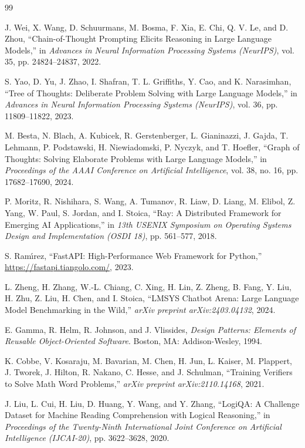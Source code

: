 \documentclass[12pt,a4paper]{report}
\begin{document}
\begin{thebibliography}{99}

 J. Wei, X. Wang, D. Schuurmans, M. Bosma, F. Xia, E. Chi, Q. V. Le, and D. Zhou, ``Chain-of-Thought Prompting Elicits Reasoning in Large Language Models,'' in \emph{Advances in Neural Information Processing Systems (NeurIPS)}, vol. 35, pp. 24824--24837, 2022.

 S. Yao, D. Yu, J. Zhao, I. Shafran, T. L. Griffiths, Y. Cao, and K. Narasimhan, ``Tree of Thoughts: Deliberate Problem Solving with Large Language Models,'' in \emph{Advances in Neural Information Processing Systems (NeurIPS)}, vol. 36, pp. 11809--11822, 2023.

 M. Besta, N. Blach, A. Kubicek, R. Gerstenberger, L. Gianinazzi, J. Gajda, T. Lehmann, P. Podstawski, H. Niewiadomski, P. Nyczyk, and T. Hoefler, ``Graph of Thoughts: Solving Elaborate Problems with Large Language Models,'' in \emph{Proceedings of the AAAI Conference on Artificial Intelligence}, vol. 38, no. 16, pp. 17682--17690, 2024.

 P. Moritz, R. Nishihara, S. Wang, A. Tumanov, R. Liaw, D. Liang, M. Elibol, Z. Yang, W. Paul, S. Jordan, and I. Stoica, ``Ray: A Distributed Framework for Emerging AI Applications,'' in \emph{13th USENIX Symposium on Operating Systems Design and Implementation (OSDI 18)}, pp. 561--577, 2018.

 S. Ram{\'\i}rez, ``FastAPI: High-Performance Web Framework for Python,'' \url{https://fastapi.tiangolo.com/}, 2023.

 L. Zheng, H. Zhang, W.-L. Chiang, C. Xing, H. Lin, Z. Zheng, B. Fang, Y. Liu, H. Zhu, Z. Liu, H. Chen, and I. Stoica, ``LMSYS Chatbot Arena: Large Language Model Benchmarking in the Wild,'' \emph{arXiv preprint arXiv:2403.04132}, 2024.

 E. Gamma, R. Helm, R. Johnson, and J. Vlissides, \emph{Design Patterns: Elements of Reusable Object-Oriented Software}. Boston, MA: Addison-Wesley, 1994.

 K. Cobbe, V. Kosaraju, M. Bavarian, M. Chen, H. Jun, L. Kaiser, M. Plappert, J. Tworek, J. Hilton, R. Nakano, C. Hesse, and J. Schulman, ``Training Verifiers to Solve Math Word Problems,'' \emph{arXiv preprint arXiv:2110.14168}, 2021.

 J. Liu, L. Cui, H. Liu, D. Huang, Y. Wang, and Y. Zhang, ``LogiQA: A Challenge Dataset for Machine Reading Comprehension with Logical Reasoning,'' in \emph{Proceedings of the Twenty-Ninth International Joint Conference on Artificial Intelligence (IJCAI-20)}, pp. 3622--3628, 2020.


\end{thebibliography}
\end{document}
